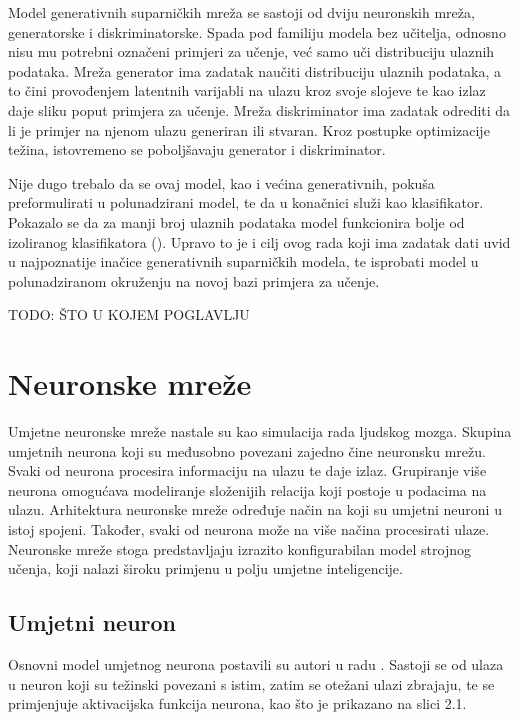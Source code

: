 \documentclass[times, utf8, diplomski]{fer}
\begin{document}
Model generativnih suparničkih mreža se sastoji od dviju neuronskih mreža, generatorske i diskriminatorske. Spada pod familiju modela bez učitelja, odnosno nisu mu potrebni označeni primjeri za učenje, već samo uči distribuciju ulaznih podataka. Mreža generator ima zadatak naučiti distribuciju ulaznih podataka, a to čini provođenjem latentnih varijabli na ulazu kroz svoje slojeve te kao izlaz daje sliku poput primjera za učenje. Mreža diskriminator ima zadatak odrediti da li je primjer na njenom ulazu generiran ili stvaran. Kroz postupke optimizacije težina, istovremeno se poboljšavaju generator i diskriminator. \par

Nije dugo trebalo da se ovaj model, kao i većina generativnih, pokuša preformulirati u polunadzirani model, te da u konačnici služi kao klasifikator. Pokazalo se da za manji broj ulaznih podataka model funkcionira bolje od izoliranog klasifikatora (\cite{odena}). Upravo to je i cilj ovog rada koji ima zadatak dati uvid u najpoznatije inačice generativnih suparničkih modela, te isprobati model u polunadziranom okruženju na novoj bazi primjera za učenje.

TODO: ŠTO U KOJEM POGLAVLJU

\chapter{Neuronske mreže}
Umjetne neuronske mreže nastale su kao simulacija rada ljudskog mozga. Skupina umjetnih neurona koji su međusobno povezani zajedno čine neuronsku mrežu. Svaki od neurona procesira informaciju na ulazu te daje izlaz. Grupiranje više neurona omogućava modeliranje složenijih relacija koji postoje u podacima na ulazu. Arhitektura neuronske mreže određuje način na koji su umjetni neuroni u istoj spojeni. Također, svaki od neurona može na više načina procesirati ulaze. Neuronske mreže stoga predstavljaju izrazito konfigurabilan model strojnog učenja, koji nalazi široku primjenu u polju umjetne inteligencije.

\section{Umjetni neuron}
Osnovni model umjetnog neurona postavili su autori u radu \cite{mcculloch}. Sastoji se od ulaza u neuron koji su težinski povezani s istim, zatim se otežani ulazi zbrajaju, te se primjenjuje aktivacijska funkcija neurona, kao što je prikazano na slici 2.1. \par
\end{document}
